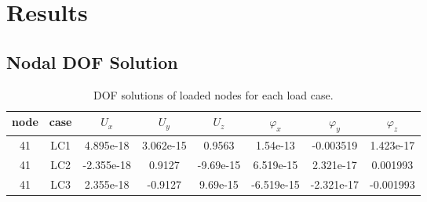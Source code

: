 \documentclass{article}%
\begin{document}
%
\section{Results}%
\label{sec:Results}%

%
\subsection{Nodal DOF Solution}%
\label{subsec:NodalDOFSolution}%
\begin{table}[h!]\centering%
\begin{tabular}{| c c | c c c c c c |}%
\hline%
node&case&$U_x$&$U_y$&$U_z$&$\varphi_x$&$\varphi_y$&$\varphi_z$\\%
\hline%
\hline%
41&LC1&4.895e{-}18&3.062e{-}15&0.9563&1.54e{-}13&{-}0.003519&1.423e{-}17\\%
41&LC2&{-}2.355e{-}18&0.9127&{-}9.69e{-}15&6.519e{-}15&2.321e{-}17&0.001993\\%
41&LC3&2.355e{-}18&{-}0.9127&9.69e{-}15&{-}6.519e{-}15&{-}2.321e{-}17&{-}0.001993\\%
\hline%
\end{tabular}%
\caption{DOF solutions of loaded nodes for each load case.}\label{table:tbl-dofsol}\end{table}%
\end{document}
